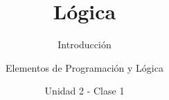 \documentclass[usenames,dvipsnames]{../../common/beamerUNQaccessible}
\title{Lógica}
\subtitle{Introducción}
\author{Elementos de Programación y Lógica}
\date{Unidad 2 - Clase 1}
\begin{document}
  \titleframe
  \toc
  
  \finaltitleframe
\end{document}
